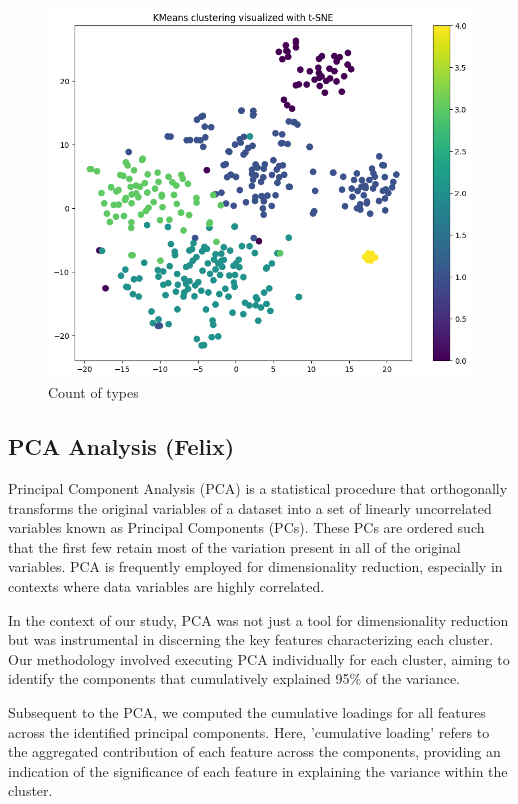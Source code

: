 \documentclass[12pt]{article}
\begin{document}
\begin{figure}[h]
  \centering
  \includegraphics[width=0.7\linewidth]{images/Kmeans_5_clusters}
  \caption{Count of types}
  \label{fig:cluster}
  \end{figure}


\subsection{PCA Analysis (Felix)}

Principal Component Analysis (PCA) is a statistical procedure that orthogonally transforms the original variables of a dataset into a set of linearly uncorrelated variables known as Principal Components (PCs). These PCs are ordered such that the first few retain most of the variation present in all of the original variables. PCA is frequently employed for dimensionality reduction, especially in contexts where data variables are highly correlated.

In the context of our study, PCA was not just a tool for dimensionality reduction but was instrumental in discerning the key features characterizing each cluster. Our methodology involved executing PCA individually for each cluster, aiming to identify the components that cumulatively explained 95\% of the variance.

Subsequent to the PCA, we computed the cumulative loadings for all features across the identified principal components. Here, 'cumulative loading' refers to the aggregated contribution of each feature across the components, providing an indication of the significance of each feature in explaining the variance within the cluster.
\end{document}

